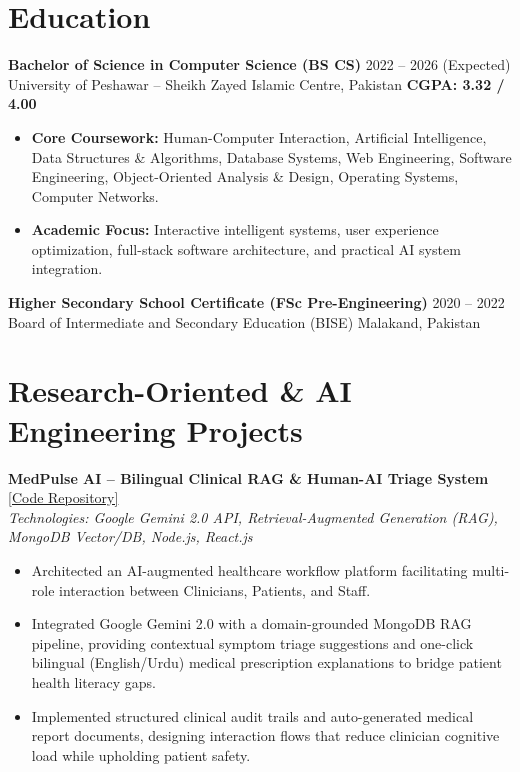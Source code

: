 \documentclass[10pt,a4paper]{article}
\begin{document}
\section{Education}
\textbf{Bachelor of Science in Computer Science (BS CS)} \hfill 2022 -- 2026 (Expected) \\
University of Peshawar -- Sheikh Zayed Islamic Centre, Pakistan \hfill \textbf{CGPA: 3.32 / 4.00}
\begin{itemize}
    \item \textbf{Core Coursework:} Human-Computer Interaction, Artificial Intelligence, Data Structures \& Algorithms, Database Systems, Web Engineering, Software Engineering, Object-Oriented Analysis \& Design, Operating Systems, Computer Networks.
    \item \textbf{Academic Focus:} Interactive intelligent systems, user experience optimization, full-stack software architecture, and practical AI system integration.
\end{itemize}

\vspace{4pt}
\textbf{Higher Secondary School Certificate (FSc Pre-Engineering)} \hfill 2020 -- 2022 \\
Board of Intermediate and Secondary Education (BISE) Malakand, Pakistan

\section{Research-Oriented \& AI Engineering Projects}

\textbf{MedPulse AI -- Bilingual Clinical RAG \& Human-AI Triage System} \hfill \href{https://github.com/nabilroghani/AI-Powered-Clinic-Management-SaaS}{[Code Repository]} \\
\textit{Technologies: Google Gemini 2.0 API, Retrieval-Augmented Generation (RAG), MongoDB Vector/DB, Node.js, React.js}
\begin{itemize}
    \item Architected an AI-augmented healthcare workflow platform facilitating multi-role interaction between Clinicians, Patients, and Staff.
    \item Integrated Google Gemini 2.0 with a domain-grounded MongoDB RAG pipeline, providing contextual symptom triage suggestions and one-click bilingual (English/Urdu) medical prescription explanations to bridge patient health literacy gaps.
    \item Implemented structured clinical audit trails and auto-generated medical report documents, designing interaction flows that reduce clinician cognitive load while upholding patient safety.
\end{itemize}
\end{document}
